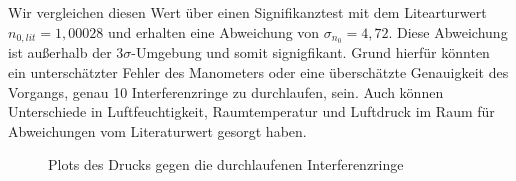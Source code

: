 \documentclass{article}
\begin{document}
Wir vergleichen diesen Wert über einen Signifikanztest mit dem Litearturwert $n_{0,lit} = 1,00028$ und erhalten eine Abweichung von $\sigma_{n_0} = 4,72$. Diese Abweichung ist außerhalb der $3\sigma$-Umgebung und somit signigfikant. Grund hierfür könnten ein unterschätzter Fehler des Manometers oder eine überschätzte Genauigkeit des Vorgangs, genau 10 Interferenzringe zu durchlaufen, sein. Auch können Unterschiede in Luftfeuchtigkeit, Raumtemperatur und Luftdruck im Raum für Abweichungen vom Literaturwert gesorgt haben.

\begin{figure}[!bp]
  \centering
  \hfill
  \hfill
  \hfill
  \caption{Plots des Drucks gegen die durchlaufenen Interferenzringe}
  \label{fig:PLOTs_DRUCK_INTERFERENZRINGE}
\end{figure}
\end{document}
